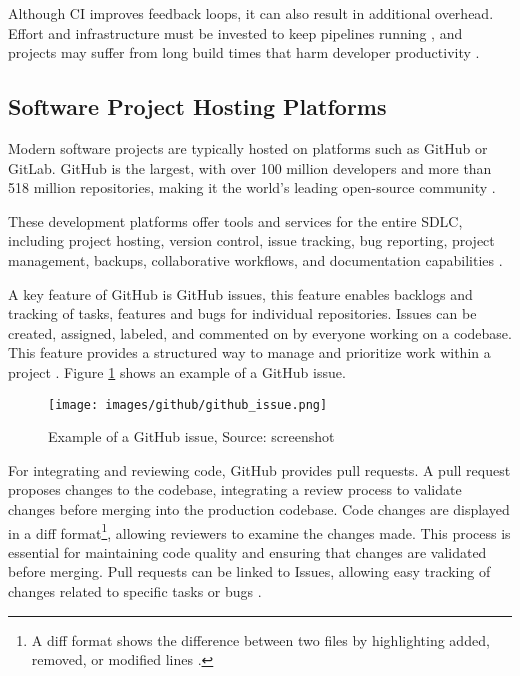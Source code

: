 Although \ac{CI} improves feedback loops, it can also result in additional overhead. Effort and infrastructure must be invested to keep pipelines running \cite{hiltonUsageCostsBenefits2016}, and projects may suffer from long build times that harm developer productivity \cite{ghalebEmpiricalStudyLong2019}.

\subsection{Software Project Hosting Platforms} \label{subsection:Software Project Hosting Platforms}

Modern software projects are typically hosted on platforms such as GitHub or GitLab. GitHub is the largest, with over 100 million developers and more than 518 million repositories, making it the world's leading open-source community \cite{staffOctoverseAILeads2024}.

These development platforms offer tools and services for the entire \ac{SDLC}, including project hosting, version control, issue tracking, bug reporting, project management, backups, collaborative workflows, and documentation capabilities \cite{GitHubFeatures2025, abrahamssonAgileSoftwareDevelopment2017}.

A key feature of GitHub is GitHub issues, this feature enables backlogs and tracking of tasks, features and bugs for individual repositories. Issues can be created, assigned, labeled, and commented on by everyone working on a codebase. This feature provides a structured way to manage and prioritize work within a project \cite{Issues}. Figure \ref{fig:gh-issue} shows an example of a GitHub issue.

\begin{figure}[H]
    \centering
    \texttt{[image: images/github/github\_issue.png]}
    \caption{Example of a GitHub issue, Source: screenshot}
    \label{fig:gh-issue}
\end{figure}

For integrating and reviewing code, GitHub provides pull requests. A pull request proposes changes to the codebase, integrating a review process to validate changes before merging into the production codebase. Code changes are displayed in a diff format\footnote{A diff format shows the difference between two files by highlighting added, removed, or modified lines \cite{WhatDiffUnderstanding}.}, allowing reviewers to examine the changes made. This process is essential for maintaining code quality and ensuring that changes are validated before merging. Pull requests can be linked to Issues, allowing easy tracking of changes related to specific tasks or bugs \cite{PullRequests}.

